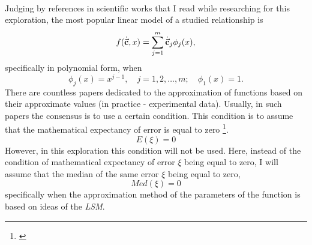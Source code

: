 \\
Judging by references in scientific works that I read while researching for this exploration, the most popular linear model of a studied relationship is
\begin{equation}
f(\dot{\vec{\textbf{c}}},x)= \sum\limits_{j=1}^{m} \dot{\vec{\textbf{c}}}_{j} \phi_{j}(x), \label{functionform}
\end{equation}
specifically in polynomial form, when
\begin{equation}
\phi_{j}(x)=x^{j-1},\quad j=1,2,\dots,m; \quad \phi_{1}(x) = 1.
\end{equation}
There are countless papers dedicated to the approximation of functions based on their approximate values (in practice - experimental data). Usually, in such papers the consensus is to use a certain condition. This condition is to assume that the mathematical expectancy of error is equal to zero \footnote{\cite{Plackett_1950}}.
\begin{equation}
E(\xi)=0
\end{equation}
 However, in this exploration this condition will not be used. Here, instead of the condition of mathematical expectancy of error $\xi$ being equal to zero, I will assume that the median of the same error $\xi$ being equal to zero, 
\begin{equation}
Med(\xi)=0
\end{equation}
specifically when the approximation method of the parameters of the function is based on ideas of the \textit{LSM}. \\
